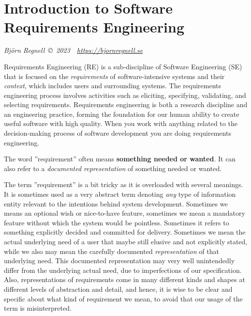 
\chapter*{Introduction to Software Requirements Engineering}

\textit{Björn Regnell\hfill~\copyright~2023~~\url{https://bjornregnell.se}}

\vspace{3em}

\noindent Requirements Engineering (RE) is a sub-discipline of Software Engineering (SE) that is focused on the \textit{requirements} of software-intensive systems and their \textit{context}, which includes users and surrounding systems. 
The requirements engineering process involves activities such as eliciting, specifying, validating, and selecting requirements. 
Requirements engineering is both a research discipline and an engineering practice, forming the foundation for our human ability to create useful software with high quality. When you work with anything related to the decision-making process of software development you are doing requirements engineering.  

The word ''requirement'' often means \textbf{something needed or wanted}. It can also refer to a \emph{documented representation} of something needed or wanted. 

The term ''requirement'' is a bit tricky as it is overloaded with several meanings. It is sometimes used as a very abstract term denoting \textit{any} type of information entity relevant to the intentions behind system development.  Sometimes we means an optional wish or nice-to-have feature, sometimes we mean a mandatory feature without which the system would be pointless. Sometimes it refers to something explicitly decided and committed for delivery. Sometimes we mean the actual underlying need of a user that maybe still elusive and not explicitly stated, while we also may mean the carefully documented \textit{representation} of that underlying need. This documented representation may very well unintendedly differ from the underlying actual need, due to imperfections of our specification. 
Also, representations of requirements come in many different kinds and shapes at different levels of abstraction and detail, and hence, it is wise to be clear and specific about what kind of requirement we mean, to avoid that our usage of the term is misinterpreted. 

